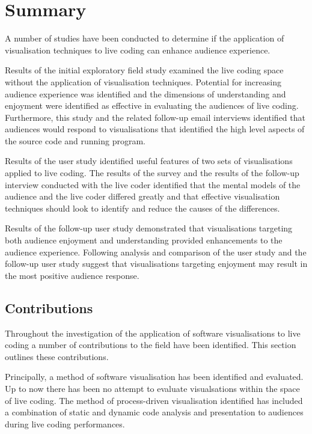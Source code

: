 
\chapter{Summary}
\label{chap:summary}

A number of studies have been conducted to determine if the application of visualisation techniques to live coding can enhance audience experience.

Results of the initial exploratory field study examined the live coding space without the application of visualisation techniques. Potential for increasing audience experience was identified and the dimensions of understanding and enjoyment were identified as effective in evaluating the audiences of live coding. Furthermore, this study and the related follow-up email interviews identified that audiences would respond to visualisations that identified the high level aspects of the source code and running program.

Results of the user study identified useful features of two sets of visualisations applied to live coding. The results of the survey and the results of the follow-up interview conducted with the live coder identified that the mental models of the audience and the live coder differed greatly and that effective visualisation techniques should look to identify and reduce the causes of the differences.

Results of the follow-up user study demonstrated that visualisations targeting  both audience enjoyment and understanding provided enhancements to the audience experience. Following analysis and comparison of the user study and the follow-up user study suggest that visualisations targeting enjoyment may result in the most positive audience response.

\section{Contributions}

Throughout the investigation of the application of software visualisations to live coding a number of contributions to the field have been identified. This section outlines these contributions.

Principally, a method of software visualisation has been identified and evaluated. Up to now there has been no attempt to evaluate visualsations within the space of live coding. The method of process-driven visualisation identified has included a combination of static and dynamic code analysis and presentation to audiences during live coding performances.

